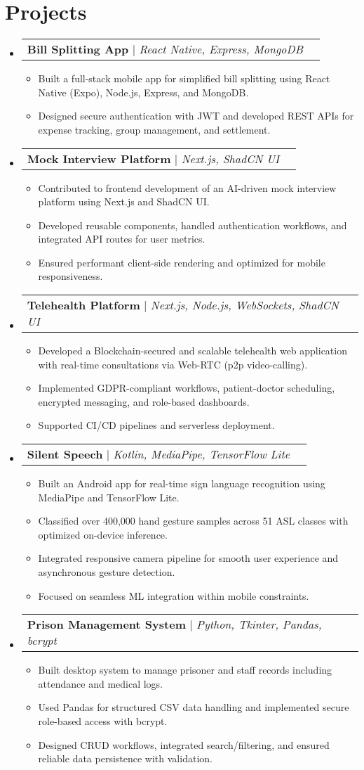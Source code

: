 \documentclass[letterpaper,11pt]{article}
\makeatletter
\newcommand{\resumeItem}[1]{
  \item\small{
    {#1 \vspace{-2pt}}
  }
}
\newcommand{\resumeProjectHeading}[2]{
    \item
    \begin{tabular*}{1.001\textwidth}{l@{\extracolsep{\fill}}r}
      \small#1 & \textbf{\small #2}\\
    \end{tabular*}\vspace{-7pt}
}
\newcommand{\resumeSubHeadingListStart}{\begin{itemize}[leftmargin=0.0in, label={}]}
\newcommand{\resumeSubHeadingListEnd}{\end{itemize}}
\newcommand{\resumeItemListStart}{\begin{itemize}}
\newcommand{\resumeItemListEnd}{\end{itemize}\vspace{-5pt}}
\makeatother
\begin{document}
\section{Projects}
    \vspace{-5pt}
    \resumeSubHeadingListStart
      \resumeProjectHeading
  {\textbf{Bill Splitting App} $|$ \emph{React Native, Express, MongoDB}}{}
  \resumeItemListStart
    \resumeItem{Built a full-stack mobile app for simplified bill splitting using React Native (Expo), Node.js, Express, and MongoDB.}
    \resumeItem{Designed secure authentication with JWT and developed REST APIs for expense tracking, group management, and settlement.}
  \resumeItemListEnd
 \vspace{-13pt}
\resumeProjectHeading
  {\textbf{Mock Interview Platform} $|$ \emph{Next.js, ShadCN UI}}{}
  \resumeItemListStart
    \resumeItem{Contributed to frontend development of an AI-driven mock interview platform using Next.js and ShadCN UI.}
    \resumeItem{Developed reusable components, handled authentication workflows, and integrated API routes for user metrics.}
    \resumeItem{Ensured performant client-side rendering and optimized for mobile responsiveness.}
  \resumeItemListEnd
 \vspace{-13pt}
\resumeProjectHeading
  {\textbf{Telehealth Platform} $|$ \emph{Next.js, Node.js, WebSockets, ShadCN UI}}{}
  \resumeItemListStart
    \resumeItem{Developed a Blockchain-secured and scalable telehealth web application with real-time consultations via Web-RTC (p2p video-calling).}
    \resumeItem{Implemented GDPR-compliant workflows, patient-doctor scheduling, encrypted messaging, and role-based dashboards.}
    \resumeItem{Supported CI/CD pipelines and serverless deployment.}
  \resumeItemListEnd
 \vspace{-13pt}
\resumeProjectHeading
  {\textbf{Silent Speech} $|$ \emph{Kotlin, MediaPipe, TensorFlow Lite}}{}
  \resumeItemListStart
    \resumeItem{Built an Android app for real-time sign language recognition using MediaPipe and TensorFlow Lite.}
    \resumeItem{Classified over 400,000 hand gesture samples across 51 ASL classes with optimized on-device inference.}
    \resumeItem{Integrated responsive camera pipeline for smooth user experience and asynchronous gesture detection.}
    \resumeItem{Focused on seamless ML integration within mobile constraints.}
  \resumeItemListEnd
 \vspace{-13pt}
\resumeProjectHeading
  {\textbf{Prison Management System} $|$ \emph{Python, Tkinter, Pandas, bcrypt}}{}
  \resumeItemListStart
    \resumeItem{Built desktop system to manage prisoner and staff records including attendance and medical logs.}
    \resumeItem{Used Pandas for structured CSV data handling and implemented secure role-based access with bcrypt.}
    \resumeItem{Designed CRUD workflows, integrated search/filtering, and ensured reliable data persistence with validation.}
  \resumeItemListEnd
    \resumeSubHeadingListEnd
\vspace{-10pt}
\end{document}
